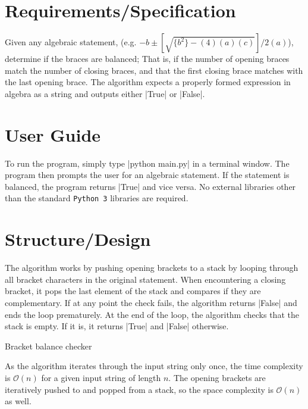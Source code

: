 \documentclass{report}
\begin{document}
\section{Requirements/Specification}
Given any algebraic statement, (e.g. \(-b \pm \left[\sqrt{\{b^2\}-(4)(a)(c)}\right]/2(a)\)), determine if the braces are balanced; That is, if the number of opening braces match the number of closing braces, and that the first closing brace matches with the last opening brace. The algorithm expects a properly formed expression in algebra as a string and outputs either |True| or |False|.
\section{User Guide}
To run the program, simply type |python main.py| in a terminal window. The program then prompts the user for an algebraic statement. If the statement is balanced, the program returns |True| and vice versa. No external libraries other than the standard \texttt{Python 3} libraries are required.
\section{Structure/Design}
The algorithm works by pushing opening brackets to a stack by looping through all bracket characters in the original statement. When encountering a closing bracket, it pops the last element of the stack and compares if they are complementary. If at any point the check fails, the algorithm returns |False| and ends the loop prematurely. At the end of the loop, the algorithm checks that the stack is empty. If it is, it returns |True| and |False| otherwise.
\begin{algorithm}[H]
	\SetAlgoLined
	\SetNoFillComment
	\vspace{3mm}
	\caption{Bracket balance checker}
\end{algorithm}
As the algorithm iterates through the input string only once, the time complexity is \(\mathcal{O}(n)\) for a given input string of length \(n\). The opening brackets are iteratively pushed to and popped from a stack, so the space complexity is \(\mathcal{O}(n)\) as well.
\end{document}

